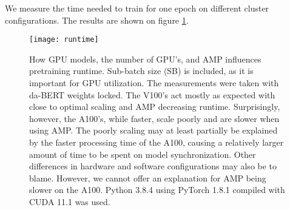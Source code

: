 \documentclass[main.tex]{subfiles}
\begin{document}
We measure the time needed to train for one epoch on different cluster configurations.
The results are shown on figure \ref{fig:runtime}.
\begin{figure}[H]
    \centering
    \texttt{[image: runtime]}
    \caption{
        How GPU models, the number of GPU's, and AMP influences pretraining runtime.
        Sub-batch size (SB) is included, as it is important for GPU utilization.
        The measurements were taken with da-BERT weights locked.
        The V100's act mostly as expected with close to optimal scaling and AMP decreasing runtime.
        Surprisingly, however, the A100's, while faster, scale poorly and are slower when using AMP.
        The poorly scaling may at least partially be explained by the faster processing time of the A100, causing a relatively larger amount of time to be spent on model synchronization.
        Other differences in hardware and software configurations may also be to blame.
        However, we cannot offer an explanation for AMP being slower on the A100.
        Python 3.8.4 using PyTorch 1.8.1 compiled with CUDA 11.1 was used.
    }
    \label{fig:runtime}
\end{figure}\noindent
\end{document}
